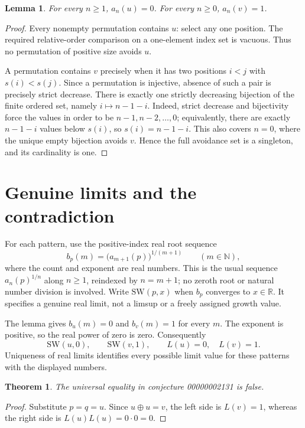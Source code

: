 \documentclass[10pt]{article}
\newtheorem{theorem}{Theorem}
\newtheorem{lemma}{Lemma}
\begin{document}
\begin{lemma}
For every $n\geq1$, $a_n(u)=0$. For every $n\geq0$, $a_n(v)=1$.
\end{lemma}
\begin{proof}
Every nonempty permutation contains $u$: select any one position. The required
relative-order comparison on a one-element index set is vacuous. Thus no
permutation of positive size avoids $u$.

A permutation contains $v$ precisely when it has two positions $i<j$ with
$s(i)<s(j)$. Since a permutation is injective, absence of such a pair is
precisely strict decrease. There is exactly one strictly decreasing bijection
of the finite ordered set, namely $i\mapsto n-1-i$. Indeed, strict decrease and
bijectivity force the values in order to be $n-1,n-2,\ldots,0$; equivalently,
there are exactly $n-1-i$ values below $s(i)$, so $s(i)=n-1-i$.
This also covers $n=0$, where the unique empty bijection avoids $v$.
Hence the full avoidance set is a singleton, and its cardinality is one.
\end{proof}

\section{Genuine limits and the contradiction}
For each pattern, use the positive-index real root sequence
\[
 b_p(m)=\bigl(a_{m+1}(p)\bigr)^{1/(m+1)}\qquad(m\in\mathbb N),
\]
where the count and exponent are real numbers. This is the usual sequence
$a_n(p)^{1/n}$ along $n\geq1$, reindexed by $n=m+1$; no zeroth root or natural
number division is involved. Write $\mathrm{SW}(p,x)$ when $b_p$ converges to
$x\in\mathbb R$. It specifies a genuine real limit, not a limsup or a freely
assigned growth value.

The lemma gives $b_u(m)=0$ and $b_v(m)=1$ for every $m$. The exponent is positive,
so the real power of zero is zero. Consequently
\[
 \mathrm{SW}(u,0),\qquad \mathrm{SW}(v,1),\qquad L(u)=0,\quad L(v)=1.
\]
Uniqueness of real limits identifies every possible limit value for these
patterns with the displayed numbers.

\begin{theorem}
The universal equality in conjecture 00000002131 is false.
\end{theorem}
\begin{proof}
Substitute $p=q=u$. Since $u\oplus u=v$, the left side is $L(v)=1$, whereas
the right side is $L(u)L(u)=0\cdot0=0$.
\end{proof}
\end{document}
